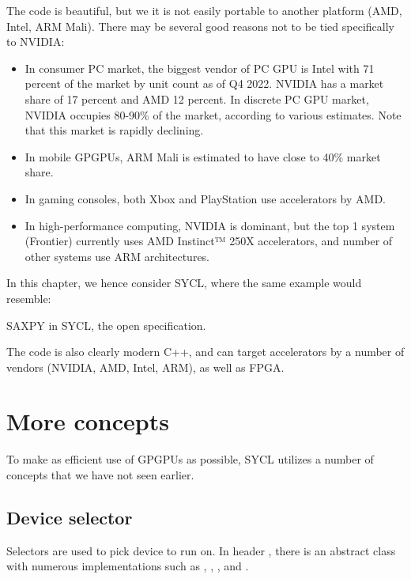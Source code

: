 The code is beautiful, but we it is not easily portable to another platform (AMD, Intel, ARM Mali). There may be several good reasons not to be tied specifically to NVIDIA:
\begin{itemize}
\item In consumer PC market, the biggest vendor of PC GPU is Intel with 71 percent of the market by unit count as of Q4 2022. NVIDIA has a market share of 17 percent and AMD 12 percent. In discrete PC GPU market, NVIDIA occupies 80-90\% of the market, according to various estimates. 
Note that this market is rapidly declining.
\item In mobile GPGPUs, ARM Mali is estimated to have close to 40\% market share.  
\item In gaming consoles, both Xbox and PlayStation use accelerators by AMD. 
\item In high-performance computing, NVIDIA is dominant, but the top 1 system (Frontier) currently uses AMD Instinct™ 250X accelerators, and number of other systems use ARM architectures. 
\end{itemize}

In this chapter, we hence consider SYCL, where the same example would resemble:

\raggedbottom
\begin{codebox}[]{}
\footnotesize SAXPY in SYCL, the open specification.
\tcblower
{}
\end{codebox}

The code is also clearly modern C++, and can target accelerators by a number of vendors (NVIDIA, AMD, Intel, ARM), as well as FPGA.

\section{More concepts}

To make as efficient use of GPGPUs as possible, SYCL utilizes a number of concepts that 
we have not seen earlier.

\subsection{Device selector}

Selectors are used to pick device to run on.
In header , there is an abstract class  with numerous implementations
such as , , , and .

